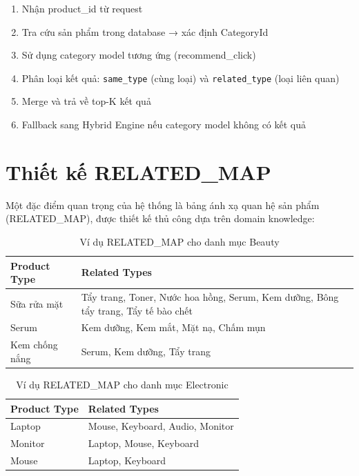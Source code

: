 \documentclass[12pt,a4paper]{report}
\begin{document}
\begin{enumerate}
    \item Nhận product\_id từ request
    \item Tra cứu sản phẩm trong database → xác định CategoryId
    \item Sử dụng category model tương ứng (recommend\_click)
    \item Phân loại kết quả: \texttt{same\_type} (cùng loại) và \texttt{related\_type} (loại liên quan)
    \item Merge và trả về top-K kết quả
    \item Fallback sang Hybrid Engine nếu category model không có kết quả
\end{enumerate}

\section{Thiết kế RELATED\_MAP}

Một đặc điểm quan trọng của hệ thống là bảng ánh xạ quan hệ sản phẩm (RELATED\_MAP), được thiết kế thủ công dựa trên domain knowledge:

\begin{table}[H]
\centering
\caption{Ví dụ RELATED\_MAP cho danh mục Beauty}
\label{tab:related_map_beauty}
\begin{tabular}{lp{9cm}}
\toprule
\textbf{Product Type} & \textbf{Related Types} \\
\midrule
Sữa rửa mặt & Tẩy trang, Toner, Nước hoa hồng, Serum, Kem dưỡng, Bông tẩy trang, Tẩy tế bào chết \\
Serum & Kem dưỡng, Kem mắt, Mặt nạ, Chấm mụn \\
Kem chống nắng & Serum, Kem dưỡng, Tẩy trang \\
\bottomrule
\end{tabular}
\end{table}

\begin{table}[H]
\centering
\caption{Ví dụ RELATED\_MAP cho danh mục Electronic}
\label{tab:related_map_electronic}
\begin{tabular}{lp{9cm}}
\toprule
\textbf{Product Type} & \textbf{Related Types} \\
\midrule
Laptop & Mouse, Keyboard, Audio, Monitor \\
Monitor & Laptop, Mouse, Keyboard \\
Mouse & Laptop, Keyboard \\
\bottomrule
\end{tabular}
\end{table}
\end{document}
